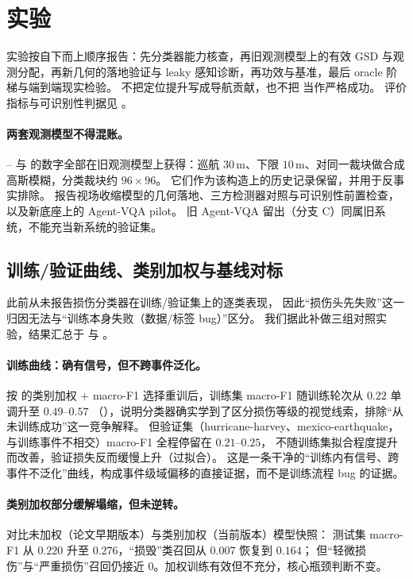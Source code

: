 \section{实验}
\label{sec:experiments}

实验按自下而上顺序报告：先分类器能力核查，再旧观测模型上的有效 GSD 与观测分配，再新几何的落地验证与 leaky 感知诊断，再功效与基准，最后 oracle 阶梯与端到端现实检验。
不把定位提升写成导航贡献，也不把 \semSR 当作严格成功。
评价指标与可识别性判据见 。

\paragraph{两套观测模型不得混账。}
-- 与  的数字全部在旧观测模型上获得：巡航 $30\,\mathrm{m}$、下限 $10\,\mathrm{m}$、对同一裁块做合成高斯模糊，分类裁块约 $96\times96$。
它们作为该构造上的历史记录保留，并用于反事实排除。
 报告视场收缩模型的几何落地、三方检测器对照与可识别性前置检查，以及新底座上的 Agent-VQA pilot。
旧 Agent-VQA 留出（分支 C）同属旧系统，不能充当新系统的验证集。

\subsection{训练/验证曲线、类别加权与基线对标}
\label{sec:x1train}
此前从未报告损伤分类器在训练/验证集上的逐类表现，
因此``损伤头先失败''这一归因无法与``训练本身失败（数据/标签 bug）''区分。
我们据此补做三组对照实验，结果汇总于  与 。

\paragraph{训练曲线：确有信号，但不跨事件泛化。}
按  的类别加权 + macro-F1 选择重训后，训练集 macro-F1 随训练轮次从 $0.22$ 单调升至 $0.49$--$0.57$
（），说明分类器确实学到了区分损伤等级的视觉线索，排除``从未训练成功''这一竞争解释。
但验证集（hurricane-harvey、mexico-earthquake，与训练事件不相交）macro-F1 全程停留在 $0.21$--$0.25$，
不随训练集拟合程度提升而改善，验证损失反而缓慢上升（过拟合）。
这是一条干净的``训练内有信号、跨事件不泛化''曲线，构成事件级域偏移的直接证据，而不是训练流程 bug 的证据。

\paragraph{类别加权部分缓解塌缩，但未逆转。}
 对比未加权（论文早期版本）与类别加权（当前版本）模型快照：
测试集 macro-F1 从 $0.220$ 升至 $0.276$，``损毁''类召回从 $0.007$ 恢复到 $0.164$；
但``轻微损伤''与``严重损伤''召回仍接近 0。加权训练有效但不充分，核心瓶颈判断不变。

